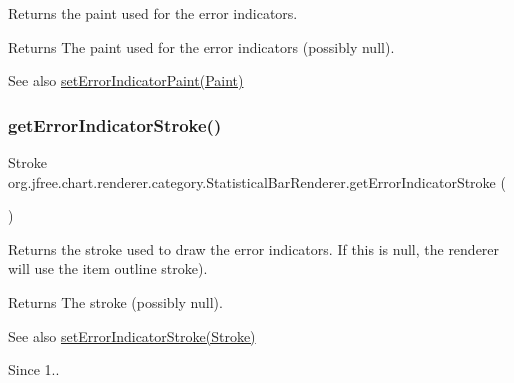 Returns the paint used for the error indicators.

\begin{DoxyReturn}{Returns}
The paint used for the error indicators (possibly {\ttfamily null}).
\end{DoxyReturn}
\begin{DoxySeeAlso}{See also}
\mbox{\hyperlink{classorg_1_1jfree_1_1chart_1_1renderer_1_1category_1_1_statistical_bar_renderer_a51a43129656c76dc6134e5b9b4bc65bd}{set\+Error\+Indicator\+Paint(\+Paint)}} 
\end{DoxySeeAlso}
\mbox{\label{classorg_1_1jfree_1_1chart_1_1renderer_1_1category_1_1_statistical_bar_renderer_a12a547abd30256cc05729bd86bcb7084}} 
\subsubsection{\texorpdfstring{get\+Error\+Indicator\+Stroke()}{getErrorIndicatorStroke()}}
{\footnotesize\ttfamily Stroke org.\+jfree.\+chart.\+renderer.\+category.\+Statistical\+Bar\+Renderer.\+get\+Error\+Indicator\+Stroke (\begin{DoxyParamCaption}{ }\end{DoxyParamCaption})}

Returns the stroke used to draw the error indicators. If this is {\ttfamily null}, the renderer will use the item outline stroke).

\begin{DoxyReturn}{Returns}
The stroke (possibly {\ttfamily null}).
\end{DoxyReturn}
\begin{DoxySeeAlso}{See also}
\mbox{\hyperlink{classorg_1_1jfree_1_1chart_1_1renderer_1_1category_1_1_statistical_bar_renderer_a5858ebcf353d862a3a30986c4e2ef65f}{set\+Error\+Indicator\+Stroke(\+Stroke)}}
\end{DoxySeeAlso}
\begin{DoxySince}{Since}
1.. 
\end{DoxySince}
\mbox{\label{classorg_1_1jfree_1_1chart_1_1renderer_1_1category_1_1_statistical_bar_renderer_a51a43129656c76dc6134e5b9b4bc65bd}} 
